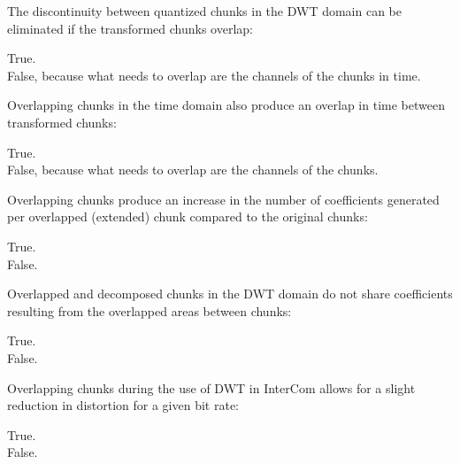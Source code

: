 \documentclass[legalpaper, 12pt, addpoints]{exam}
\begin{document}
\begin{questions}
\vspace{0.10in}

\question The discontinuity between quantized chunks in the DWT domain can be eliminated if the transformed chunks overlap:

\begin{oneparchoices}
  \choice True.\\
  \choice False, because what needs to overlap are the channels of the chunks in time.
\end{oneparchoices}
  
\vspace{0.10in}

\question Overlapping chunks in the time domain also produce an overlap in time between transformed chunks:

\begin{oneparchoices}
  \choice True.\\
  \choice False, because what needs to overlap are the channels of the chunks.
\end{oneparchoices}
  
\vspace{0.10in}

\question Overlapping chunks produce an increase in the number of coefficients generated per overlapped (extended) chunk compared to the original chunks:

\begin{oneparchoices}
  \choice True.\\
  \choice False.
\end{oneparchoices}
  
\vspace{0.10in}

\question Overlapped and decomposed chunks in the DWT domain do not share coefficients resulting from the overlapped areas between chunks:

\begin{oneparchoices}
  \choice True.\\
  \choice False.
\end{oneparchoices}
  
\vspace{0.10in}

\question Overlapping chunks during the use of DWT in InterCom allows for a slight reduction in distortion for a given bit rate:

\begin{oneparchoices}
  \choice True.\\
  \choice False.
\end{oneparchoices}
  

\end{questions}
\end{document}
